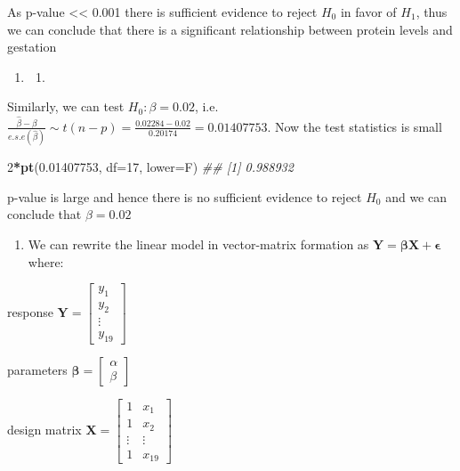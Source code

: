 \documentclass[
]{book}
\newenvironment{Shaded}{\begin{snugshade}}{\end{snugshade}}
\newcommand{\CommentTok}[1]{\textcolor[rgb]{0.56,0.35,0.01}{\textit{#1}}}
\newcommand{\DataTypeTok}[1]{\textcolor[rgb]{0.13,0.29,0.53}{#1}}
\newcommand{\DecValTok}[1]{\textcolor[rgb]{0.00,0.00,0.81}{#1}}
\newcommand{\FloatTok}[1]{\textcolor[rgb]{0.00,0.00,0.81}{#1}}
\newcommand{\KeywordTok}[1]{\textcolor[rgb]{0.13,0.29,0.53}{\textbf{#1}}}
\newcommand{\NormalTok}[1]{#1}
\newcommand{\OperatorTok}[1]{\textcolor[rgb]{0.81,0.36,0.00}{\textbf{#1}}}
\providecommand{\tightlist}{%
  \setlength{\itemsep}{0pt}\setlength{\parskip}{0pt}}
\theoremstyle{definition}
\theoremstyle{definition}
\theoremstyle{definition}
\theoremstyle{remark}
\begin{document}
As p-value \textless\textless{} 0.001 there is sufficient evidence to reject \(H_0\) in favor of \(H_1\), thus we can conclude that there is a significant relationship between protein levels and gestation

\begin{enumerate}
\def\labelenumi{\alph{enumi})}
\setcounter{enumi}{1}
\item
  \begin{enumerate}
  \def\labelenumii{\roman{enumii}.}
  \setcounter{enumii}{1}
  \tightlist
  \item
  \end{enumerate}
\end{enumerate}

Similarly, we can test \(H_0:\beta = 0.02\), i.e.~\(\frac{\hat{\beta} - \beta}{e.s.e(\hat{\beta})} \sim t(n-p) = \frac{0.02284 - 0.02}{0.20174} = 0.01407753\). Now the test statistics is small

\begin{Shaded}
\begin{Highlighting}[]
\DecValTok{2}\OperatorTok{*}\KeywordTok{pt}\NormalTok{(}\FloatTok{0.01407753}\NormalTok{, }\DataTypeTok{df=}\DecValTok{17}\NormalTok{, }\DataTypeTok{lower=}\NormalTok{F)}
\CommentTok{\#\# [1] 0.988932}
\end{Highlighting}
\end{Shaded}

p-value is large and hence there is no sufficient evidence to reject \(H_0\) and we can conclude that \(\beta = 0.02\)

\begin{enumerate}
\def\labelenumi{\alph{enumi})}
\setcounter{enumi}{2}
\tightlist
\item
  We can rewrite the linear model in vector-matrix formation as \(\mathbf{Y}= \mathbf{\beta}\mathbf{X} + \mathbf{\epsilon}\) where:
\end{enumerate}

response \(\mathbf{Y}=\begin{bmatrix}  y_1 \\  y_2 \\  \vdots \\  y_{19} \end{bmatrix}\)

parameters \(\mathbf{\beta}=\begin{bmatrix}  \alpha \\  \beta \end{bmatrix}\)

design matrix \(\mathbf{X}=\begin{bmatrix}  1 & x_1 \\  1 & x_2 \\  \vdots & \vdots \\  1 & x_{19} \end{bmatrix}\)
\end{document}
